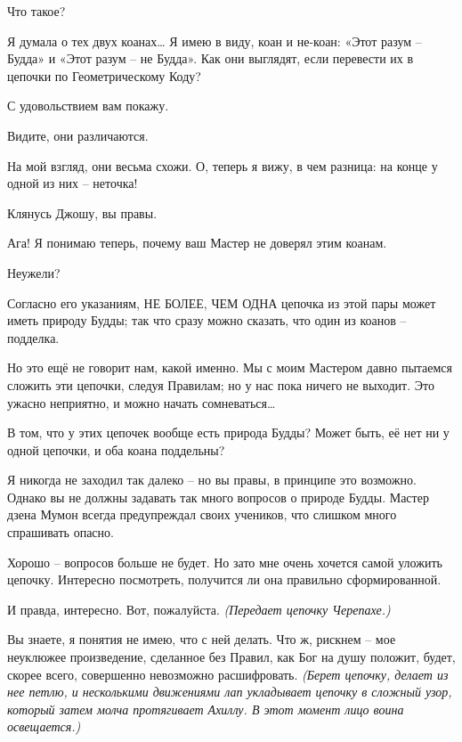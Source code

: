 \documentclass[../main.tex]{subfiles}
\begin{document}
\begin{dialogue}
 Что такое?

 Я думала о тех двух коанах\ldots{} Я имею в виду, коан и не-коан: «Этот разум \--- Будда» и «Этот разум \--- не Будда». Как они выглядят, если перевести их в цепочки по Геометрическому Коду?

 С удовольствием вам покажу.


Видите, они различаются.

 На мой взгляд, они весьма схожи. О, теперь я вижу, в чем разница: на конце у одной из них \--- неточка!

 Клянусь Джошу, вы правы.

 Ага! Я понимаю теперь, почему ваш Мастер не доверял этим коанам.

 Неужели?

 Согласно его указаниям, НЕ БОЛЕЕ, ЧЕМ ОДНА цепочка из этой пары может иметь природу Будды; так что сразу можно сказать, что один из коанов \--- подделка.

 Но это ещё не говорит нам, какой именно. Мы с моим Мастером давно пытаемся сложить эти цепочки, следуя Правилам; но у нас пока ничего не выходит. Это ужасно неприятно, и можно начать сомневаться\ldots{}

 В том, что у этих цепочек вообще есть природа Будды? Может быть, её нет ни у одной цепочки, и оба коана поддельны?

 Я никогда не заходил так далеко \--- но вы правы, в принципе это возможно. Однако вы не должны задавать так много вопросов о природе Будды. Мастер дзена Мумон всегда предупреждал своих учеников, что слишком много спрашивать опасно.

 Хорошо \--- вопросов больше не будет. Но зато мне очень хочется самой уложить цепочку. Интересно посмотреть, получится ли она правильно сформированной.

 И правда, интересно. Вот, пожалуйста. \emph{(Передает цепочку Черепахе.)}

 Вы знаете, я понятия не имею, что с ней делать. Что ж, рискнем \--- мое неуклюжее произведение, сделанное без Правил, как Бог на душу положит, будет, скорее всего, совершенно невозможно расшифровать. \emph{(Берет цепочку, делает из нее петлю, и несколькими движениями лап укладывает цепочку в сложный узор, который затем молча протягивает Ахиллу. В этот момент лицо воина освещается.)}


\end{dialogue}
\end{document}
